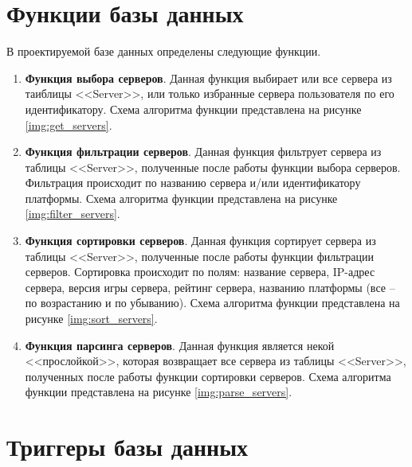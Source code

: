 \section{Функции базы данных}

В проектируемой базе данных определены следующие функции.

\begin{enumerate}
    \item \textbf{Функция выбора серверов}. Данная функция выбирает или все сервера из таиблицы <<Server>>, или только избранные сервера пользователя по его идентификатору. Схема алгоритма функции представлена на рисунке \ref{img:get_servers}.

    \item \textbf{Функция фильтрации серверов}. Данная функция фильтрует сервера из таблицы <<Server>>, полученные после работы функции выбора серверов. Фильтрация происходит по названию сервера и/или идентификатору платформы. Схема алгоритма функции представлена на рисунке \ref{img:filter_servers}.

    \item \textbf{Функция сортировки серверов}. Данная функция сортирует сервера из таблицы <<Server>>, полученные после работы функции фильтрации серверов. Сортировка происходит по полям: название сервера, IP-адрес сервера, версия игры сервера, рейтинг сервера, названию платформы (все -- по возрастанию и по убыванию). Схема алгоритма функции представлена на рисунке \ref{img:sort_servers}.

    \item \textbf{Функция парсинга серверов}. Данная функция является некой <<прослойкой>>, которая возвращает все сервера из таблицы <<Server>>, полученных после работы функции сортировки серверов. Схема алгоритма функции представлена на рисунке \ref{img:parse_servers}.
\end{enumerate}

\clearpage
{}




\section{Триггеры базы данных}

